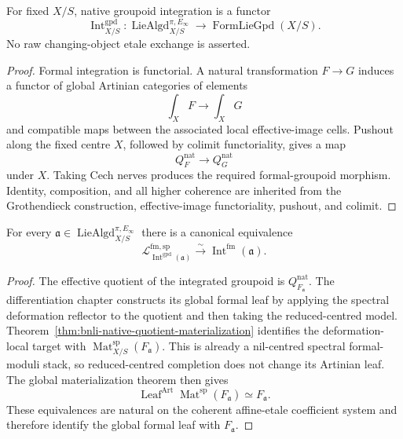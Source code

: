 \begin{theorem}
\label{thm:bnli-integration-functor}
For fixed $X/S$, native groupoid integration is a functor
\[
\boxed{
    \operatorname{Int}^{\mathrm{gpd}}_{X/S}:
    \operatorname{LieAlgd}^{\pi,E_\infty}_{X/S}
    \longrightarrow
    \operatorname{FormLieGpd}(X/S).}
\]
No raw changing-object etale exchange is asserted.
\end{theorem}

\begin{proof}
Formal integration is functorial.  A natural transformation $F\to G$ induces
a functor of global Artinian categories of elements
\[
    \int_XF\longrightarrow\int_XG
\]
and compatible maps between the associated local effective-image cells.
Pushout along the fixed centre $X$, followed by colimit functoriality, gives a
map
\[
    Q_F^{\mathrm{nat}}\longrightarrow Q_G^{\mathrm{nat}}
\]
under $X$.  Taking Cech nerves produces the required formal-groupoid morphism.
Identity, composition, and all higher coherence are inherited from the
Grothendieck construction, effective-image functoriality, pushout, and colimit.
\end{proof}

\begin{theorem}
\label{thm:bnli-leaf-recovery}
For every
$\mathfrak a\in\operatorname{LieAlgd}^{\pi,E_\infty}_{X/S}$ there is a
canonical equivalence
\[
\boxed{
    \mathcal L^{\mathrm{fm,sp}}_{
      \operatorname{Int}^{\mathrm{gpd}}(\mathfrak a)}
    \xrightarrow{\sim}
    \operatorname{Int}^{\mathrm{fm}}(\mathfrak a).}
\]
\end{theorem}

\begin{proof}
The effective quotient of the integrated groupoid is
$Q_{F_{\mathfrak a}}^{\mathrm{nat}}$.  The differentiation chapter constructs
its global formal leaf by applying the spectral deformation reflector to the
quotient and then taking the reduced-centred model.  Theorem~\ref{thm:bnli-native-quotient-materialization} identifies the deformation-local
target with
$\operatorname{Mat}^{\mathrm{sp}}_{X/S}(F_{\mathfrak a})$.  This is already a
nil-centred spectral formal-moduli stack, so reduced-centred completion does
not change its Artinian leaf.  The global materialization theorem then gives
\[
    \operatorname{Leaf}^{\mathrm{Art}}
    \operatorname{Mat}^{\mathrm{sp}}(F_{\mathfrak a})
    \simeq F_{\mathfrak a}.
\]
These equivalences are natural on the coherent affine-etale coefficient
system and therefore identify the global formal leaf with
$F_{\mathfrak a}$.
\end{proof}

